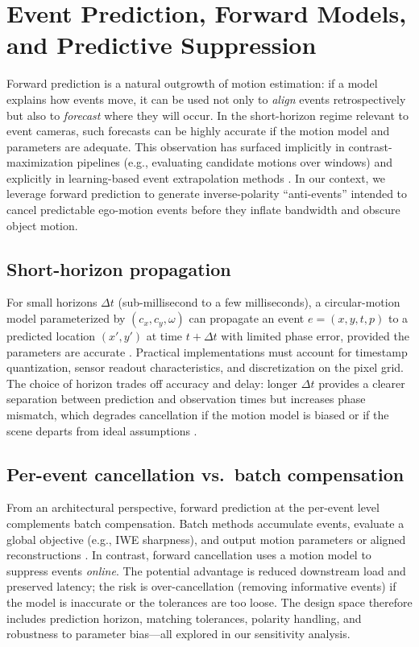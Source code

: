 \section{Event Prediction, Forward Models, and Predictive Suppression}
\label{sec:prediction-suppression}

Forward prediction is a natural outgrowth of motion estimation: if a model explains how events move, it can be used not only to \emph{align} events retrospectively but also to \emph{forecast} where they will occur. In the short-horizon regime relevant to event cameras, such forecasts can be highly accurate if the motion model and parameters are adequate. This observation has surfaced implicitly in contrast-maximization pipelines (e.g., evaluating candidate motions over windows) and explicitly in learning-based event extrapolation methods \cite{Gallego2018CMax,Gallego2020Survey}. In our context, we leverage forward prediction to generate inverse-polarity ``anti-events'' intended to cancel predictable ego-motion events before they inflate bandwidth and obscure object motion.

\subsection{Short-horizon propagation}
For small horizons $\Delta t$ (sub-millisecond to a few milliseconds), a circular-motion model parameterized by $(c_x,c_y,\omega)$ can propagate an event $e=(x,y,t,p)$ to a predicted location $(x',y')$ at time $t+\Delta t$ with limited phase error, provided the parameters are accurate \cite{Gallego2017Angular}. Practical implementations must account for timestamp quantization, sensor readout characteristics, and discretization on the pixel grid. The choice of horizon trades off accuracy and delay: longer $\Delta t$ provides a clearer separation between prediction and observation times but increases phase mismatch, which degrades cancellation if the motion model is biased or if the scene departs from ideal assumptions \cite{Gallego2018CMax}.

\subsection{Per-event cancellation vs.\ batch compensation}
From an architectural perspective, forward prediction at the per-event level complements batch compensation. Batch methods accumulate events, evaluate a global objective (e.g., IWE sharpness), and output motion parameters or aligned reconstructions \cite{Bardow2016SOFIE,Gallego2018CMax}. In contrast, forward cancellation uses a motion model to suppress events \emph{online}. The potential advantage is reduced downstream load and preserved latency; the risk is over-cancellation (removing informative events) if the model is inaccurate or the tolerances are too loose. The design space therefore includes prediction horizon, matching tolerances, polarity handling, and robustness to parameter bias—all explored in our sensitivity analysis.

